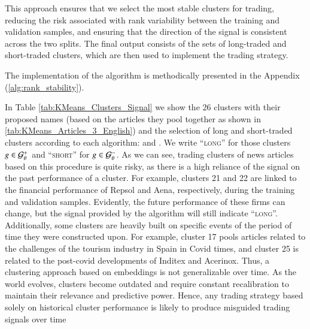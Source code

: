 This approach ensures that we select the most stable clusters for trading, reducing the risk associated with rank variability between the training and validation samples, and ensuring that the direction of the signal is consistent across the two splits. The final output consists of the sets of long-traded and short-traded clusters, which are then used to implement the trading strategy.


The implementation of the algorithm is methodically presented in the Appendix (\cref{alg:rank_stability}).



In Table \ref{tab:KMeans_Clusters_Signal} we show the 26 clusters with their proposed names (based on the articles they pool together as shown in \cref{tab:KMeans_Articles_3_English}) and the selection of long and short-traded clusters according to each algorithm:  and . We write ``\textsc{long}'' for those clusters $g\in\mathcal{G}_\theta^+$ and ``\textsc{short}'' for $g\in\mathcal{G}_\theta^-$. 
%
As we can see, trading clusters of news articles based on this procedure is quite risky, as there is a high reliance of the signal on the past performance of a cluster. For example, clusters 21 and 22 are linked to the financial performance of Repsol and Aena, respectively, during the training and validation samples. Evidently, the future performance of these firms can change, but the signal provided by the algorithm will still indicate ``\textsc{long}''. 
%
Additionally, some clusters are heavily built on specific events of the period of time they were constructed upon. For example, cluster 17 pools articles related to the challenges of the tourism industry in Spain in Covid times, and cluster 25 is related to the post-covid developments of Inditex and Acerinox. Thus, a clustering approach based on embeddings is not generalizable over time. As the world evolves, clusters become outdated and require constant recalibration to maintain their relevance and predictive power. Hence, any trading strategy based solely on historical cluster performance is likely to produce misguided trading signals over time 

